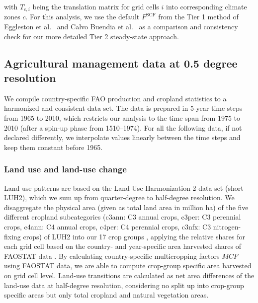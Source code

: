 \documentclass[gc, manuscript]{copernicus}
\begin{document}
with \(T_{c,i}\) being the translation matrix for grid cells \(i\) into corresponding climate zones \(c\). For this analysis, we use the default \(F^{\mathrm{SCF}}\) from the Tier 1 method of Eggleston et al.~\citeyearpar{eggleston_ipcc_2006} and Calvo Buendia et al.~\citeyearpar{calvo_buendia_ipcc_2019} as a comparison and consistency check for our more detailed Tier 2 steady-state approach.

\hypertarget{sec:agrimanagement}{%
\subsection{Agricultural management data at 0.5 degree resolution}\label{sec:agrimanagement}}

We compile country-specific FAO production and cropland statistics \citep{faostat_faostat_2016} to a harmonized and consistent data set. The data is prepared in 5-year time steps from 1965 to 2010, which restricts our analysis to the time span from 1975 to 2010 (after a spin-up phase from 1510--1974). For all the following data, if not declared differently, we interpolate values linearly between the time steps and keep them constant before 1965.

\hypertarget{sec:landuse}{%
\subsubsection{Land use and land-use change}\label{sec:landuse}}

Land-use patterns are based on the Land-Use Harmonization 2 \citep{hurtt_harmonization_2020} data set (short LUH2), which we sum up from quarter-degree to half-degree resolution. We disaggregate the physical area (given as total land area in million ha) of the five different cropland subcategories (c3ann: C3 annual crops, c3per: C3 perennial crops, c4ann: C4 annual crops, c4per: C4 perennial crops, c3nfx: C3 nitrogen-fixing crops) of LUH2 into our 17 crop groups \citep[see Table ``FAO2LUH2MAG\_croptypes.csv'' in][]{karstens_model_2020}, applying the relative shares for each grid cell based on the country- and year-specific area harvested shares of FAOSTAT data \citep{faostat_faostat_2016}. By calculating country-specific multicropping factors \(MCF\) using FAOSTAT data, we are able to compute crop-group specific area harvested on grid cell level.
Land-use transitions are calculated as net area differences of the land-use data at half-degree resolution, considering no split up into crop-group specific areas but only total cropland and natural vegetation areas.
\end{document}
